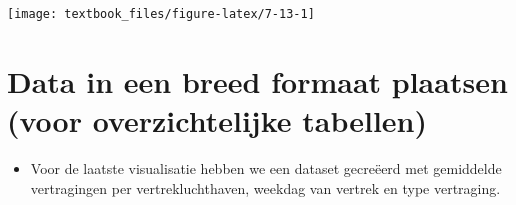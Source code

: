\documentclass[]{tufte-book}
\providecommand{\tightlist}{%
  \setlength{\itemsep}{0pt}\setlength{\parskip}{0pt}}
\begin{document}
\texttt{[image: textbook\_files/figure-latex/7-13-1]}

\hypertarget{data-in-een-breed-formaat-plaatsen-voor-overzichtelijke-tabellen}{%
\section{Data in een breed formaat plaatsen (voor overzichtelijke tabellen)}\label{data-in-een-breed-formaat-plaatsen-voor-overzichtelijke-tabellen}}

\begin{itemize}
\tightlist
\item
  Voor de laatste visualisatie hebben we een dataset gecreëerd met gemiddelde vertragingen per vertrekluchthaven, weekdag van vertrek en type vertraging.
\end{itemize}
\end{document}
